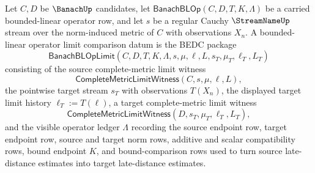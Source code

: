 \begin{definition}
\label{def:banach-bounded-linear-operator-limit-comparison}
Let $C,D$ be $\BanachUp$ candidates, let
$\mathsf{BanachBLOp}(C,D,T,K,\Lambda)$ be a carried bounded-linear operator
row, and let $s$ be a regular Cauchy $\StreamNameUp$ stream over the
norm-induced metric of $C$ with observations $X_n$. A bounded-linear operator
limit comparison datum is the BEDC package
$$
\mathsf{BanachBLOpLimit}(C,D,T,K,\Lambda,s,\mu,\ell,L,s_T,\mu_T,\ell_T,L_T)
$$
consisting of the source complete-metric limit witness
$$
\mathsf{CompleteMetricLimitWitness}(C,s,\mu,\ell,L),
$$
the pointwise target stream $s_T$ with observations $T(X_n)$, the displayed
target limit history $\ell_T:=T(\ell)$, a target complete-metric limit witness
$$
\mathsf{CompleteMetricLimitWitness}(D,s_T,\mu_T,\ell_T,L_T),
$$
and the visible operator ledger $\Lambda$ recording the source endpoint row,
target endpoint row, source and target norm rows, additive and scalar
compatibility rows, bound endpoint $K$, and bound-comparison rows used to
turn source late-distance estimates into target late-distance estimates.
\end{definition}

